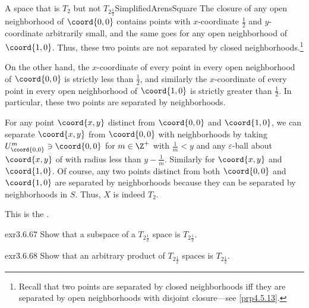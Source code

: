 \begin{exm}{A space that is $T_2$ but not $T_{2\frac{1}{2}}$}{SimplifiedArensSquare}
The closure of any open neighborhood of $\coord{0,0}$ contains points with $x$-coordinate $\frac{1}{2}$ and $y$-coordinate arbitrarily small, and the same goes for any open neighborhood of $\coord{1,0}$.  Thus, these two points are not separated by closed neighborhoods.\footnote{Recall that two points are separated by closed neighborhoods iff they are separated by open neighborhoods with disjoint closure---see \cref{prp4.5.13}.}

On the other hand, the $x$-coordinate of every point in every open neighborhood of $\coord{0,0}$ is strictly less than $\frac{1}{2}$, and similarly the $x$-coordinate of every point in every open neighborhood of $\coord{1,0}$ is strictly greater than $\frac{1}{2}$.  In particular, these two points are separated by neighborhoods.

For any point $\coord{x,y}$ distinct from $\coord{0,0}$ and $\coord{1,0}$, we can separate $\coord{x,y}$ from $\coord{0,0}$ with neighborhoods by taking $U_{\coord{0,0}}^m\ni \coord{0,0}$ for $m\in \Z ^+$ with $\frac{1}{m}<y$ and any $\varepsilon$-ball about $\coord{x,y}$ of with radius less than $y-\frac{1}{m}$.  Similarly for $\coord{x,y}$ and $\coord{1,0}$.  Of course, any two points distinct from both $\coord{0,0}$ and $\coord{1,0}$ are separated by neighborhoods because they can be separated by neighborhoods in $S$.  Thus, $X$ is indeed $T_2$.
\begin{rmk}
This is the .
\end{rmk}
\end{exm}
\begin{exr}{}{exr3.6.67}
Show that a subspace of a $T_{2\frac{1}{2}}$ space is $T_{2\frac{1}{2}}$.
\end{exr}
\begin{exr}{}{exr3.6.68}
Show that an arbitrary product of $T_{2\frac{1}{2}}$ spaces is $T_{2\frac{1}{2}}$.
\end{exr}

